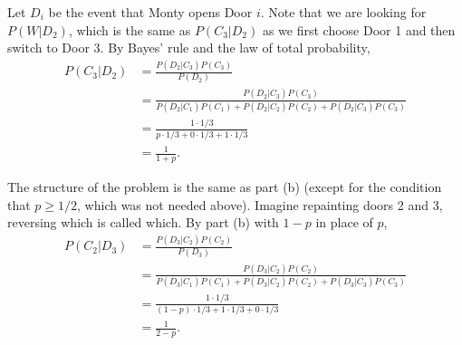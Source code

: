 {\begin{Solution}
{            Let $D_i$ be the event that Monty opens Door $i$. 
            Note that we are looking for $P(W|D_2)$, which is the same as $P(C_3|D_2)$ as we first choose Door 1 and then switch to Door 3. 
            By Bayes' rule and the law of total probability, 
            \begin{equation*}
                \begin{aligned}
                P(C_3|D_2) &= \frac{P(D_2|C_3)P(C_3)}{P(D_2)} \\
                &= \frac{P(D_2|C_3)P(C_3)}{P(D_2|C_1)P(C_1) + P(D_2|C_2)P(C_2) + P(D_2|C_3)P(C_3)} \\
                &= \frac{1 \cdot 1/3}{p \cdot 1/3 + 0 \cdot 1/3 + 1 \cdot 1/3} \\
                &= \frac{1}{1+p}. 
                \end{aligned}
            \end{equation*}
            \item 
            The structure of the problem is the same as part (b) (except for the condition that $p \geq 1/2$, which was not needed above). 
            Imagine repainting doors 2 and 3, reversing which is called which. 
            By part (b) with $1-p$ in place of $p$, 
            \begin{equation*}
                \begin{aligned}
                    P(C_2|D_3) &= \frac{P(D_3|C_2)P(C_2)}{P(D_3)} \\
                    &= \frac{P(D_3|C_2)P(C_2)}{P(D_3|C_1)P(C_1) + P(D_3|C_2)P(C_2) + P(D_3|C_3)P(C_3)} \\
                    &= \frac{1 \cdot 1/3}{(1-p) \cdot 1/3 + 1 \cdot 1/3 + 0 \cdot 1/3} \\
                    &= \frac{1}{2-p}. 
                \end{aligned}
            \end{equation*}
        }
    \end{Solution}
    \item %
    \item %
    \item %
    \item %
    \item %
    \item %
    \item %
}